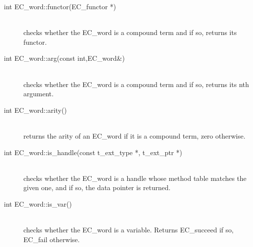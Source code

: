 \begin{description}
\item[int EC_word::functor(EC_functor *)]\ \\
	checks whether the EC_word is a compound term and if so,
	returns its functor.

\item[int EC_word::arg(const int,EC_word\&)]\ \\
	checks whether the EC_word is a compound term and if so,
	returns its nth argument.

\item[int EC_word::arity()]\ \\
	returns the arity of an EC_word if it is a compound term,
	zero otherwise.

\item[int EC_word::is_handle(const t_ext_type *, t_ext_ptr *)]\ \\
	checks whether the EC_word is a handle whose method table
	matches the given one, and if so, the data pointer is returned.

\item[int EC_word::is_var()]\ \\
	checks whether the EC_word is a variable.
	Returns EC_succeed if so, EC_fail otherwise.
\end{description}


